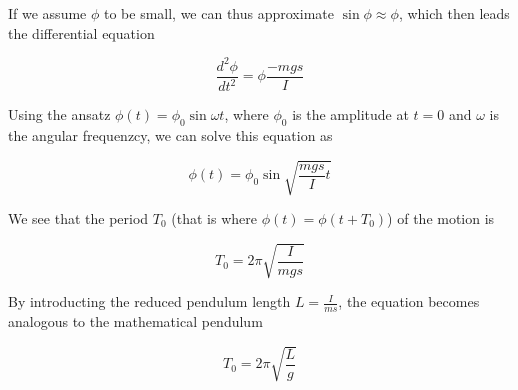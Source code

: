 \documentclass[a4paper,german,12pt,smallheadings]{scrartcl}
\begin{document}
If we assume $\phi$ to be small, we can thus approximate $\sin \phi \approx
\phi$, which then leads the differential equation

\begin{equation}
  \frac{d^2 \phi}{d t^2} = \phi \frac{-mgs}{I}
\end{equation}

Using the ansatz $\phi(t) = \phi_0 \sin \omega t$, where $\phi_0$ is the
amplitude at $t=0$ and $\omega$ is the angular frequenzcy, we can solve this
equation as

\begin{equation}
  \phi(t) = \phi_0 \sin \sqrt{\frac{mgs}{I} t}
\end{equation}

We see that the period $T_0$ (that is where $\phi(t) = \phi(t + T_0)$) of the motion is

\begin{equation}
  T_0 = 2 \pi \sqrt{\frac{I}{mgs}}
\end{equation}

By introducting the reduced pendulum length $L = \frac{I}{ms}$, the
equation becomes analogous to the mathematical pendulum

\begin{equation}
  T_0 = 2 \pi \sqrt{\frac{L}{g}}
\end{equation}
\end{document}
